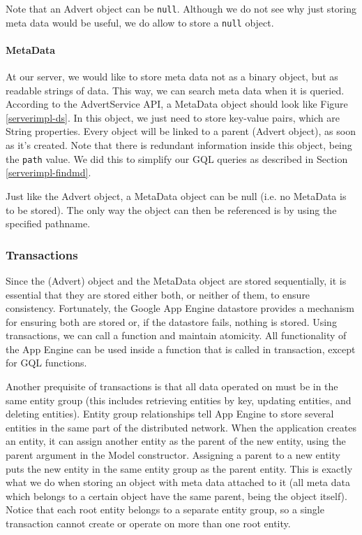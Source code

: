 Note that an Advert object can be \texttt{null}. Although we do not see why
just storing meta data would be useful, we do allow to store a \texttt{null}
object.

\paragraph{MetaData}
At our server, we would like to store meta data not as a binary object, but as
readable strings of data. This way, we can search meta data when it is queried.
According to the AdvertService API, a MetaData object should look like Figure
\ref{serverimpl-ds}. In this object, we just need to store key-value pairs, which
are String properties. Every object will be linked to a parent (Advert object),
as soon as it's created. Note that there is redundant information inside this
object, being the \texttt{path} value. We did this to simplify our GQL queries as
described in Section \ref{serverimpl-findmd}.

Just like the Advert object, a MetaData object can be null (i.e. no MetaData
is to be stored). The only way the object can then be referenced is by using
the specified pathname. 

\subsubsection{Transactions}
\label{serverimpl-trans}
Since the (Advert) object and the MetaData object are stored sequentially, it is
essential that they are stored either both, or neither of them, to ensure
consistency. Fortunately, the Google App Engine datastore provides a mechanism
for ensuring both are stored or, if the datastore fails, nothing is stored.
Using transactions, we can call a function and maintain atomicity. All
functionality of the App Engine can be used inside a function that is called in
transaction, except for GQL functions.

Another prequisite of transactions is that all data operated on must be in the
same entity group (this includes retrieving entities by key, updating entities, and
deleting entities). Entity group relationships tell App Engine to store several
entities in the same part of the distributed network. When the application
creates an entity, it can assign another entity as the parent of the new entity,
using the parent argument in the Model constructor. Assigning a parent to a new
entity puts the new entity in the same entity group as the parent entity. This is
exactly what we do when storing an object with meta data attached to it (all
meta data which belongs to a certain object have the same parent, being the
object itself). Notice that each root entity belongs to a separate entity group,
so a single transaction cannot create or operate on more than one root entity. 


